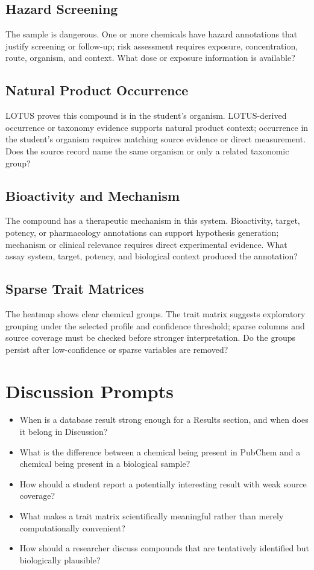\subsection{Hazard Screening}
\SafeClaim
{The sample is dangerous.}
{One or more chemicals have hazard annotations that justify screening or follow-up; risk assessment requires exposure, concentration, route, organism, and context.}
{What dose or exposure information is available?}

\subsection{Natural Product Occurrence}
\SafeClaim
{LOTUS proves this compound is in the student's organism.}
{LOTUS-derived occurrence or taxonomy evidence supports natural product context; occurrence in the student's organism requires matching source evidence or direct measurement.}
{Does the source record name the same organism or only a related taxonomic group?}

\subsection{Bioactivity and Mechanism}
\SafeClaim
{The compound has a therapeutic mechanism in this system.}
{Bioactivity, target, potency, or pharmacology annotations can support hypothesis generation; mechanism or clinical relevance requires direct experimental evidence.}
{What assay system, target, potency, and biological context produced the annotation?}

\subsection{Sparse Trait Matrices}
\SafeClaim
{The heatmap shows clear chemical groups.}
{The trait matrix suggests exploratory grouping under the selected profile and confidence threshold; sparse columns and source coverage must be checked before stronger interpretation.}
{Do the groups persist after low-confidence or sparse variables are removed?}

\section{Discussion Prompts}
\begin{itemize}
  \item When is a database result strong enough for a Results section, and when does it belong in Discussion?
  \item What is the difference between a chemical being present in PubChem and a chemical being present in a biological sample?
  \item How should a student report a potentially interesting result with weak source coverage?
  \item What makes a trait matrix scientifically meaningful rather than merely computationally convenient?
  \item How should a researcher discuss compounds that are tentatively identified but biologically plausible?
\end{itemize}


